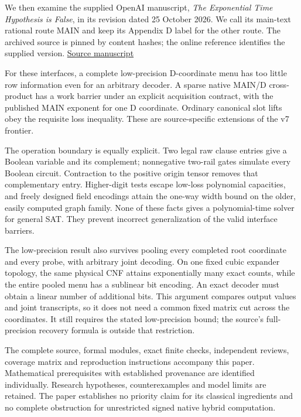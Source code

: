 \documentclass[
  11pt,
]{article}
\begin{document}
We then examine the supplied OpenAI manuscript, \emph{The Exponential
Time Hypothesis is False}, in its revision dated 25 October 2026. We
call its main-text rational route MAIN and keep its Appendix D label for
the other route. The archived source is pinned by content hashes; the
online reference identifies the supplied version.
\href{https://github.com/openai/math/tree/main/preprints/The-Exponential-Time-Hypothesis-is-False-October-25-2026}{Source
manuscript}

For these interfaces, a complete low-precision D-coordinate menu has too
little row information even for an arbitrary decoder. A sparse native
MAIN/D cross-product has a work barrier under an explicit acquisition
contract, with the published MAIN exponent for one D coordinate.
Ordinary canonical slot lifts obey the requisite loss inequality. These
are source-specific extensions of the v7 frontier.

The operation boundary is equally explicit. Two legal raw clause entries
give a Boolean variable and its complement; nonnegative two-rail gates
simulate every Boolean circuit. Contraction to the positive origin
tensor removes that complementary entry. Higher-digit tests escape
low-loss polynomial capacities, and freely designed field encodings
attain the one-way width bound on the older, easily computed graph
family. None of these facts gives a polynomial-time solver for general
SAT. They prevent incorrect generalization of the valid interface
barriers.

The low-precision result also survives pooling every completed root
coordinate and every probe, with arbitrary joint decoding. On one fixed
cubic expander topology, the same physical CNF attains exponentially
many exact counts, while the entire pooled menu has a sublinear bit
encoding. An exact decoder must obtain a linear number of additional
bits. This argument compares output values and joint transcripts, so it
does not need a common fixed matrix cut across the coordinates. It still
requires the stated low-precision bound; the source's full-precision
recovery formula is outside that restriction.

The complete source, formal modules, exact finite checks, independent
reviews, coverage matrix and reproduction instructions accompany this
paper. Mathematical prerequisites with established provenance are
identified individually. Research hypotheses, counterexamples and model
limits are retained. The paper establishes no priority claim for its
classical ingredients and no complete obstruction for unrestricted
signed native hybrid computation.
\end{document}
